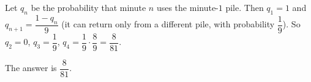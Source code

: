 Let $q_n$ be the probability that minute $n$ uses the minute-$1$ pile. Then $q_1=1$ and $q_{n+1}=\dfrac{1-q_n}{9}$ (it can return only from a different pile, with probability $\dfrac19$). So $q_2=0$, $q_3=\dfrac19$, $q_4=\dfrac19\cdot\dfrac89=\dfrac{8}{81}$.

The answer is $\boxed{\dfrac8{81}}$.
